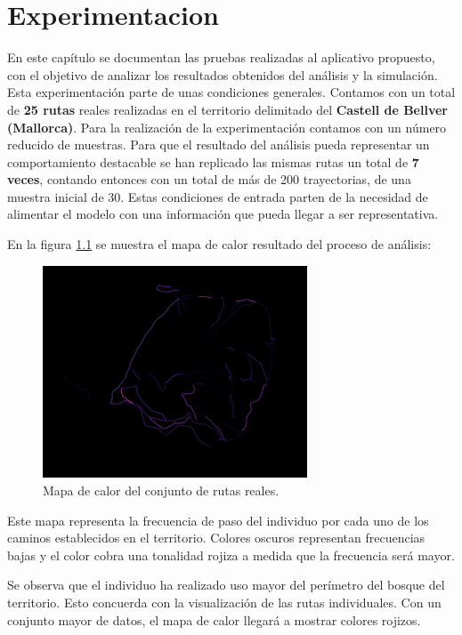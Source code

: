 \chapter{Experimentacion} \label{chapter:Experimentation}
En este capítulo se documentan las pruebas realizadas al aplicativo propuesto, con el 
objetivo de analizar los resultados obtenidos del análisis y la simulación.
Esta experimentación parte de unas condiciones generales. Contamos con un total de 
\textbf{25 rutas} reales realizadas en el territorio delimitado del \textbf{Castell de 
Bellver (Mallorca)}. Para la realización de la experimentación contamos con un número 
reducido de muestras. Para que el resultado del análisis pueda representar un 
comportamiento destacable se han replicado las mismas rutas un total de\textbf{ 7 
veces}, contando entonces con un total de más de 200 trayectorias, de una muestra 
inicial de 30. Estas condiciones de entrada parten de la necesidad de alimentar el 
modelo con una información que pueda llegar a ser representativa.

En la figura \ref{figure:RealHeatMap} se muestra el mapa de calor resultado del 
proceso de análisis:
\begin{figure}[!htb]
\begin{center}
\includegraphics[width=0.7\textwidth]{./Imagenes/HeatMap.png}
\caption{Mapa de calor del conjunto de rutas reales.}
\label{figure:RealHeatMap}
\end{center}
\end{figure}
\newpage
Este mapa representa la frecuencia de paso del individuo por cada uno de los caminos 
establecidos en el territorio. Colores oscuros representan frecuencias bajas y el color 
cobra una tonalidad rojiza a medida que la frecuencia será mayor.

Se observa que el individuo ha realizado uso mayor del perímetro del bosque del 
territorio. Esto concuerda con la visualización de las rutas individuales. Con un conjunto 
mayor de datos, el mapa de calor llegará a mostrar colores rojizos.

